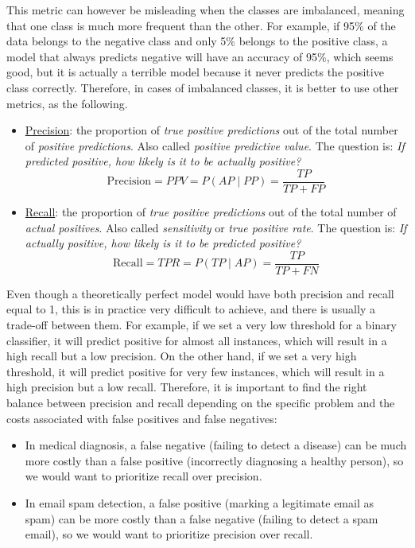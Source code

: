 This metric can however be misleading when the classes are imbalanced, meaning that one class is much more frequent than the other. For example, if 95\% of the data belongs to the negative class and only 5\% belongs to the positive class, a model that always predicts negative will have an accuracy of 95\%, which seems good, but it is actually a terrible model because it never predicts the positive class correctly. Therefore, in cases of imbalanced classes, it is better to use other metrics, as the following.
\begin{itemize}
    \item \ul{Precision}: the proportion of \emph{true positive predictions} out of the {total} number of \emph{positive predictions}. Also called \emph{positive predictive value}. The question is: \emph{If predicted positive, how likely is it to be actually positive?}
    \begin{equation} \label{label:precision}
        \text{Precision} = PPV = P(AP \mid PP) = \frac{TP}{TP + FP}
    \end{equation}
    \item \ul{Recall}: the proportion of \emph{true positive predictions} out of the {total} number of \emph{actual positives}. Also called \emph{sensitivity} or \emph{true positive rate}. The question is: \emph{If actually positive, how likely is it to be predicted positive?}
    \begin{equation} \label{label:recall}
        \text{Recall} = TPR = P(TP \mid AP) = \frac{TP}{TP + FN}
    \end{equation}
\end{itemize}

Even though a theoretically perfect model would have both precision and recall equal to 1, this is in practice very difficult to achieve, and there is usually a trade-off between them. For example, if we set a very low threshold for a binary classifier, it will predict positive for almost all instances, which will result in a high recall but a low precision. On the other hand, if we set a very high threshold, it will predict positive for very few instances, which will result in a high precision but a low recall. Therefore, it is important to find the right balance between precision and recall depending on the specific problem and the costs associated with false positives and false negatives:
\begin{itemize}
    \item In medical diagnosis, a false negative (failing to detect a disease) can be much more costly than a false positive (incorrectly diagnosing a healthy person), so we would want to prioritize recall over precision.
    \item In email spam detection, a false positive (marking a legitimate email as spam) can be more costly than a false negative (failing to detect a spam email), so we would want to prioritize precision over recall.
\end{itemize}

